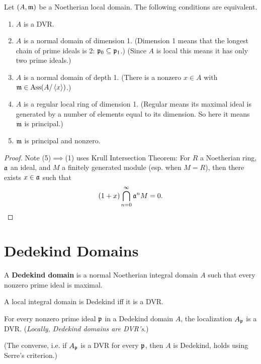\begin{thm}
Let $(A,\mathfrak{m})$ be a Noetherian local domain. The following conditions are equivalent.
\begin{enumerate}
\item $A$ is a DVR.
\item $A$ is a normal domain of dimension 1. (Dimension 1 means that the longest chain of prime ideals is 2: $\mathfrak{p}_0\subseteq \mathfrak{p}_1$.) (Since $A$ is local this means it has only two prime ideals.)
\item $A$ is a normal domain of depth 1. (There is a nonzero $x\in A$ with $\mathfrak{m}\in \operatorname{Ass}(A/\left\langle {x}\right\rangle)$.)
\item $A$ is a regular local ring of dimension 1. (Regular means its maximal ideal is generated by a number of elements equal to its dimension. So here it means $\mathfrak{m}$ is principal.)
\item $\mathfrak{m}$ is principal and nonzero.
\end{enumerate}
\end{thm}
\begin{proof}
Note (5)$\implies$(1) uses Krull Intersection Theorem: For $R$ a Noetherian ring, $\mathfrak{a}$ an ideal, and $M$ a finitely generated module (esp. when $M=R$), then there exists $x\in \mathfrak{a}$ such that 
\[
(1+x)\bigcap_{n=0}^{\infty} \mathfrak{a}^nM=0.
\] 
\end{proof}
\section{Dedekind Domains}
\begin{df}
A \textbf{Dedekind domain} is a normal Noetherian integral domain $A$ such that every nonzero prime ideal is maximal.
\end{df}
\begin{pr}
A local integral domain is Dedekind iff it is a DVR.
\end{pr}
\begin{pr}
For every nonzero prime ideal $\mathfrak{p}$ in a Dedekind domain $A$, the localization $A_{\mathfrak{p}}$ is a DVR. ({\it Locally, Dedekind domains are DVR's}.)
\end{pr}
(The converse, i.e. if $A_{\mathfrak{p}}$ is a DVR for every $\mathfrak{p}$, then $A$ is Dedekind, holds using Serre's criterion.)

